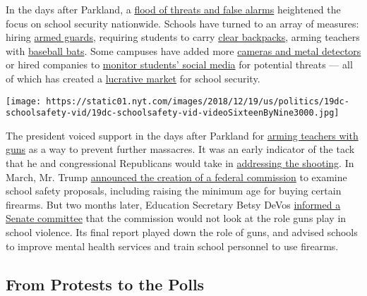 In the days after Parkland, a
\href{https://www.nytimes.com/2018/02/25/us/threats-schools-shootings.html}{flood
of threats and false alarms} heightened the focus on school security
nationwide. Schools have turned to an array of measures: hiring
\href{https://www.nytimes.com/2019/02/11/us/guns-in-schools.html}{armed
guards}, requiring students to carry
\href{https://www.nytimes.com/2018/03/21/us/florida-school-shooting-clear-backpacks.html}{clear
backpacks}, arming teachers with
\href{https://www.nytimes.com/2018/04/11/us/erie-bats-school-shooting.html}{baseball
bats}. Some campuses have added more
\href{https://www.nytimes.com/2018/08/11/us/back-to-school-security-guns.html}{cameras
and metal detectors} or hired companies to
\href{https://www.nytimes.com/2018/09/06/us/social-media-monitoring-school-shootings.html}{monitor
students' social media} for potential threats --- all of which has
created a
\href{https://www.nytimes.com/2018/03/04/business/school-security-industry-surges-after-shootings.html}{lucrative
market} for school security.

\texttt{[image: https://static01.nyt.com/images/2018/12/19/us/politics/19dc-schoolsafety-vid/19dc-schoolsafety-vid-videoSixteenByNine3000.jpg]}

The president voiced support in the days after Parkland for
\href{https://www.nytimes.com/2018/02/22/us/politics/trump-guns-school-shootings.html}{arming
teachers with guns} as a way to prevent further massacres. It was an
early indicator of the tack that he and congressional Republicans would
take in
\href{https://www.nytimes.com/2018/03/14/us/politics/congress-school-safety-gun-control-house-vote.html}{addressing
the shooting}. In March, Mr. Trump
\href{https://www.nytimes.com/2018/03/11/us/politics/trump-guns-school-training.html}{announced
the creation of a federal commission} to examine school safety
proposals, including raising the minimum age for buying certain
firearms. But two months later, Education Secretary Betsy DeVos
\href{https://www.nytimes.com/2018/06/05/us/politics/devos-guns-school-safety-commission.html}{informed
a Senate committee} that the commission would not look at the role guns
play in school violence. Its final report played down the role of guns,
and advised schools to improve mental health services and train school
personnel to use firearms.

\hypertarget{from-protests-to-the-polls}{%
\subsection{From Protests to the
Polls}\label{from-protests-to-the-polls}}


